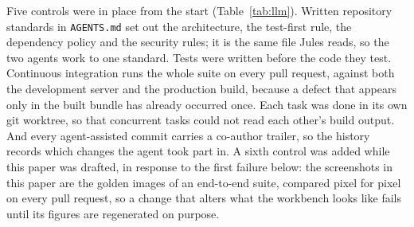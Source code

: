Five controls were in place from the start (Table~\ref{tab:llm}). Written repository standards in \texttt{AGENTS.md} set out the architecture, the test-first rule, the dependency policy and the security rules; it is the same file Jules reads, so the two agents work to one standard. Tests were written before the code they test. Continuous integration runs the whole suite on every pull request, against both the development server and the production build, because a defect that appears only in the built bundle has already occurred once. Each task was done in its own git worktree, so that concurrent tasks could not read each other's build output. And every agent-assisted commit carries a co-author trailer, so the history records which changes the agent took part in. A sixth control was added while this paper was drafted, in response to the first failure below: the screenshots in this paper are the golden images of an end-to-end suite, compared pixel for pixel on every pull request, so a change that alters what the workbench looks like fails until its figures are regenerated on purpose.

